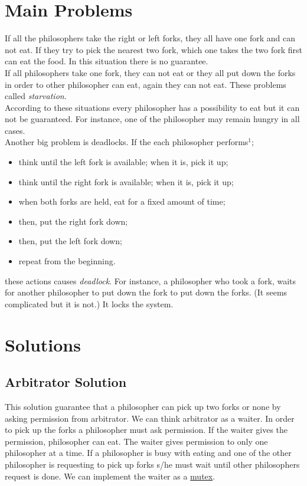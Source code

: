\documentclass[12pt,a4paper]{report}
\begin{document}
 \section*{Main Problems}
 \begin{flushleft}
  If all the philosophers take the right or left forks, they all have one fork and can not eat. If they try to pick the nearest 
  two fork, which one takes the two fork first can eat the food. In this situation there is no guarantee.\\
  \bigskip
  If all philosophers take one fork, they can not eat or they all put down the forks in order to other philosopher can eat, 
  again they can not eat. These problems called \emph{starvation}.\\
  \bigskip
  According to these situations every philosopher has a possibility to eat but it can not be guaranteed. For instance, one 
  of the philosopher may remain hungry in all cases.\\
  \bigskip
  Another big problem is deadlocks. If the each philosopher performs$^1$;
  \begin{itemize}
   \item think until the left fork is available; when it is, pick it up;
   \item think until the right fork is available; when it is, pick it up;
   \item when both forks are held, eat for a fixed amount of time;
   \item then, put the right fork down;
   \item then, put the left fork down;
   \item repeat from the beginning.
  \end{itemize}
  these actions causes \emph{deadlock}. For instance, a philosopher who took a fork, waits for another philosopher to put down the fork
  to put down the forks. (It seems complicated but it is not.) It locks the system.
 \end{flushleft}
 \pagebreak
 \section*{Solutions}
 \subsection*{Arbitrator Solution}
  \begin{flushleft}
   This solution guarantee that a philosopher can pick up two forks or none by asking permission from arbitrator. We can 
   think arbitrator as a waiter. In order to pick up the forks a philosopher must ask permission. If the waiter gives 
   the permission, philosopher can eat. The waiter gives permission to only one philosopher at a time. If a philosopher 
   is busy with eating and one of the other philosopher is requesting to pick up forks s/he must wait until other philosophers 
   request is done. We can implement the waiter as a \underline{mutex}. 
  \end{flushleft}
 
\end{document}
